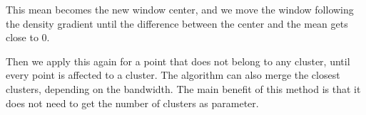 This mean becomes the new window center, and we move the window following the density gradient until the difference between the center and the mean gets close to 0.


Then we apply this again for a point that does not belong to any cluster, until every point is affected to a cluster. The algorithm can also merge the closest clusters, depending on the bandwidth.
The main benefit of this method is that it does not need to get the number of clusters as parameter.

